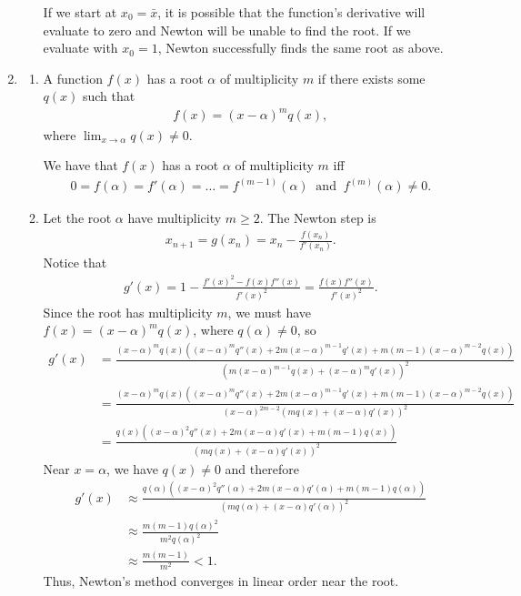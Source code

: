 \documentclass[10pt]{article}
\begin{document}
\begin{enumerate}
\begin{enumerate}
    If we start at \(x_0 = \bar{x}\), it is possible that the function's derivative will evaluate to zero and Newton will be unable to find the root. If we evaluate with \(x_0 = 1\), Newton successfully finds the same root as above. 

    {\small }
  \end{enumerate}

  \newpage
  \item \begin{enumerate}
    \item A function \(f(x)\) has a root \(\alpha\) of multiplicity \(m\) if there exists some \(q(x)\) such that \begin{align*}
      f(x) = (x-\alpha)^mq(x),
    \end{align*} where \(\lim_{x\to\alpha}q(x) \neq 0\).

    \vspace{0.5cm}

    We have that \(f(x)\) has a root \(\alpha \) of multiplicity \(m\) iff \begin{align*}
        0 = f(\alpha ) = f'(\alpha ) = \dots = f^{(m-1)}(\alpha )\;\;\mathrm{and}\;\;f^{(m)}(\alpha) \neq 0.
    \end{align*}

    \item Let the root \(\alpha\) have multiplicity \(m \geq 2\). The Newton step is \begin{align*}
        x_{n+1} = g(x_n) = x_n - \frac{f(x_n)}{f'(x_n)}.
    \end{align*} Notice that \begin{align*}
        g'(x) = 1 - \frac{f'(x)^2 - f(x)f''(x)}{f'(x)^2} = \frac{f(x)f''(x)}{f'(x)^2}.
    \end{align*} Since the root has multiplicity \(m\), we must have \(f(x) = (x-\alpha)^mq(x)\), where \(q(\alpha ) \neq 0\), so \begin{align*}
        g'(x) &= \frac{(x-\alpha)^mq(x)( (x-\alpha )^mq''(x) + 2m(x-\alpha )^{m-1}q'(x) + m(m-1)(x-\alpha)^{m-2}q(x) )}{(m(x-\alpha )^{m-1}q(x) + (x-\alpha )^mq'(x))^2} \\
        &= \frac{(x-\alpha)^mq(x)( (x-\alpha )^mq''(x) + 2m(x-\alpha )^{m-1}q'(x) + m(m-1)(x-\alpha)^{m-2}q(x) )}{(x-\alpha)^{2m-2} (mq(x) + (x-\alpha )q'(x))^2} \\
        &= \frac{q(x)( (x-\alpha )^2q''(x) + 2m(x-\alpha )q'(x) + m(m-1)q(x) )}{ (mq(x) + (x-\alpha )q'(x))^2}
    \end{align*} Near \(x=\alpha\), we have \(q(x) \neq 0\) and therefore \begin{align*}
        g'(x) &\approx \frac{q(\alpha)( (x-\alpha )^2q''(\alpha) + 2m(x-\alpha )q'(\alpha) + m(m-1)q(\alpha) )}{ (mq(\alpha) + (x-\alpha )q'(\alpha))^2} \\
        &\approx \frac{m(m-1)q(\alpha )^2}{m^2q(\alpha )^2} \\
        &\approx \frac{m(m-1)}{m^2} < 1.
    \end{align*}
    Thus, Newton's method converges in linear order near the root.


\end{enumerate}
\end{enumerate}
\end{document}
